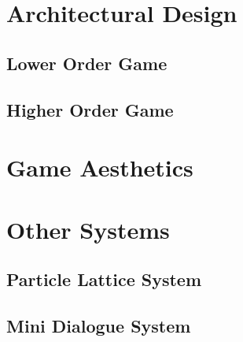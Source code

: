 \section{Architectural Design}


\subsection{Lower Order Game}


\subsection{Higher Order Game}



\section{Game Aesthetics}



\section{Other Systems}

\subsection{Particle Lattice System}


\subsection{Mini Dialogue System}

